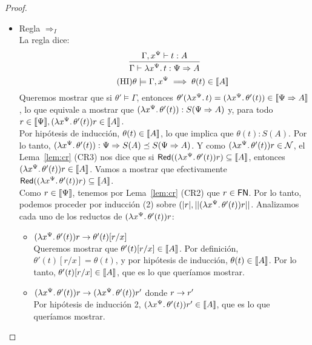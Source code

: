 \begin{proof}
\begin{itemize}
    \item Regla \( \Rightarrow_I \)
    \\ La regla dice:
    \[ \infer{\Gamma \vdash \abstr{\vrbl{x}{\Psi}}{t} : \Psi \Rightarrow A}{\Gamma, \vrbl{x}{\Psi} \vdash t : A} \]
    \[ \tag{HI} \theta \models \Gamma, x^{\Psi} \implies \theta(t) \in \llbracket A\rrbracket \]
    Queremos mostrar que si \( \theta' \models \Gamma \), entonces \( \theta'(\lambda x^{\Psi}\ldotp t) = (\lambda x^{\Psi}\ldotp\theta'(t)) \in \llbracket\Psi \Rightarrow A\rrbracket \), lo que equivale a mostrar que \( (\lambda x^{\Psi}\ldotp\theta'(t)) : S(\Psi \Rightarrow A) \) y, para todo \( r \in \llbracket\Psi\rrbracket, (\lambda x^{\Psi}\ldotp\theta'(t)) r \in \llbracket A\rrbracket \).
    \\ Por hipótesis de inducción, \( \theta(t) \in \llbracket A\rrbracket \), lo que implica que \( \theta(t) : S(A) \). Por lo tanto, \( (\lambda x^{\Psi}\ldotp\theta'(t)) : \Psi \Rightarrow S(A) \preceq S(\Psi \Rightarrow A) \). Y como \( (\lambda x^{\Psi}\ldotp\theta'(t)) r \in \mathcal{N} \), el Lema~\ref{lem:cr} (CR3) nos dice que si \( \mathsf{Red} ((\lambda x^{\Psi}\ldotp\theta'(t)) r) \subseteq \llbracket A\rrbracket \), entonces \( (\lambda x^{\Psi}\ldotp\theta'(t)) r \in \llbracket A\rrbracket \).
    Vamos a mostrar que efectivamente \( \mathsf{Red} ((\lambda x^{\Psi}\ldotp\theta'(t)) r) \subseteq \llbracket A\rrbracket \).
    \\ Como \( r \in \llbracket\Psi\rrbracket \), tenemos por Lema~\ref{lem:cr} (CR2) que \( r \in \mathsf{FN} \). Por lo tanto, podemos proceder por inducción (2) sobre \( (|r|, ||(\lambda x^{\Psi}\ldotp\theta'(t)) r|| \). Analizamos cada uno de los reductos de \( (\lambda x^{\Psi}\ldotp\theta'(t)) r \):
    \begin{itemize}
      \item \( (\lambda x^{\Psi}\ldotp\theta'(t)) r \rightarrow \theta'(t)[r/x] \)
        \\ Queremos mostrar que \( \theta'(t)[r/x] \in \llbracket A\rrbracket \). Por definición, \( \theta'(t)[r/x] = \theta(t) \), y por hipótesis de inducción, \( \theta(t) \in \llbracket A\rrbracket \). Por lo tanto, \( \theta'(t)[r/x] \in \llbracket A\rrbracket \), que es lo que queríamos mostrar.
      \item \( (\lambda x^{\Psi}\ldotp\theta'(t)) r \rightarrow (\lambda x^{\Psi}\ldotp\theta'(t)) r' \) donde \( r \rightarrow r' \)
        \\ Por hipótesis de inducción 2, \( (\lambda x^{\Psi}\ldotp\theta'(t)) r' \in \llbracket A\rrbracket \), que es lo que queríamos mostrar.

\end{itemize}
\end{itemize}
\end{proof}
